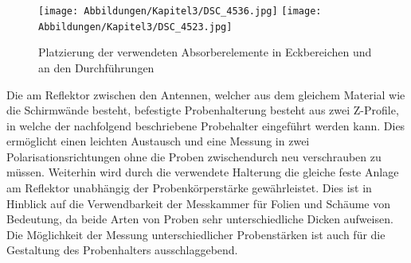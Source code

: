 \begin{figure}[ht]
    \centering
    \texttt{[image: Abbildungen/Kapitel3/DSC\_4536.jpg]}
    \hspace{.5cm}
    \texttt{[image: Abbildungen/Kapitel3/DSC\_4523.jpg]}
    \caption{Platzierung der verwendeten Absorberelemente in Eckbereichen und an den Durchführungen}
    \label{fig:3_Absorberplatzierung}
\end{figure}



    

Die am Reflektor zwischen den Antennen, welcher aus dem gleichem Material wie die Schirmwände besteht, befestigte Probenhalterung besteht aus zwei Z-Profile, in welche der nachfolgend beschriebene Probehalter eingeführt werden kann. Dies ermöglicht einen leichten Austausch und eine Messung in zwei Polarisationsrichtungen ohne die Proben zwischendurch neu verschrauben zu müssen. Weiterhin wird durch die verwendete Halterung die gleiche feste Anlage am Reflektor unabhängig der Probenkörperstärke gewährleistet. Dies ist in Hinblick auf die Verwendbarkeit der Messkammer für Folien und Schäume von Bedeutung, da beide Arten von Proben sehr unterschiedliche Dicken aufweisen. Die Möglichkeit der Messung unterschiedlicher Probenstärken ist auch für die Gestaltung des Probenhalters ausschlaggebend.
\par
\vspace{\linespace}
